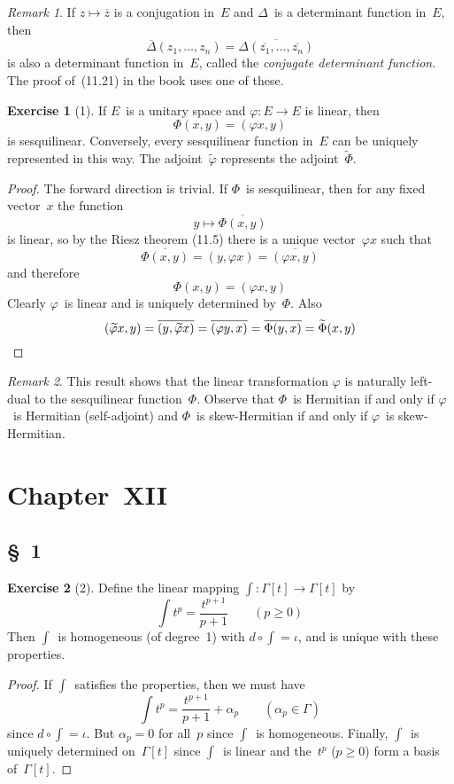 \documentclass[letterpaper,12pt]{article}
\newcommand{\after}{\circ}
\newcommand{\iprod}[2]{(#1,#2)}
\newcommand{\adj}[1]{\widetilde{#1}}
\newcommand{\conj}[1]{\overline{#1}}
\theoremstyle{definition}
\newtheorem*{exer}{Exercise}
\theoremstyle{remark}
\newtheorem*{rmk}{Remark}
\begin{document}
\begin{rmk}
If \(z\mapsto\conj{z}\) is a conjugation in~\(E\) and \(\Delta\)~is a determinant function in~\(E\), then
\[\conj{\Delta}(z_1,\ldots,z_n)=\conj{\Delta(\conj{z_1},\ldots,\conj{z_n})}\]
is also a determinant function in~\(E\), called the \emph{conjugate determinant function}. The proof of~(11.21) in the book uses one of these.
\end{rmk}

\begin{exer}[1]
If \(E\)~is a unitary space and \(\varphi:E\to E\) is linear, then
\[\Phi(x,y)=\iprod{\varphi x}{y}\]
is sesquilinear. Conversely, every sesquilinear function in~\(E\) can be uniquely represented in this way. The adjoint~\(\adj{\varphi}\) represents the adjoint~\(\adj{\Phi}\).
\end{exer}
\begin{proof}
The forward direction is trivial. If \(\Phi\)~is sesquilinear, then for any fixed vector~\(x\) the function
\[y\mapsto\conj{\Phi(x,y)}\]
is linear, so by the Riesz theorem (11.5) there is a unique vector~\(\varphi x\) such that
\[\conj{\Phi(x,y)}=\iprod{y}{\varphi x}=\conj{\iprod{\varphi x}{y}}\]
and therefore
\[\Phi(x,y)=\iprod{\varphi x}{y}\]
Clearly \(\varphi\)~is linear and is uniquely determined by~\(\Phi\). Also
\[\iprod{\adj{\varphi}x}{y}=\conj{\iprod{y}{\adj{\varphi}x}}=\conj{\iprod{\varphi y}{x}}=\conj{\Phi(y,x)}=\adj{\Phi}(x,y)\qedhere\]
\end{proof}
\begin{rmk}
This result shows that the linear transformation \(\varphi\) is naturally left-dual to the sesquilinear function~\(\Phi\). Observe that \(\Phi\)~is Hermitian if and only if \(\varphi\)~is Hermitian (self-adjoint) and \(\Phi\)~is skew-Hermitian if and only if \(\varphi\)~is skew-Hermitian.
\end{rmk}

\section*{Chapter~XII}
\subsection*{\S~1}
\begin{exer}[2]
Define the linear mapping \(\int:\Gamma[t]\to\Gamma[t]\) by
\[\int t^p=\frac{t^{p+1}}{p+1}\qquad(p\ge 0)\]
Then \(\int\)~is homogeneous (of degree~1) with \(d\after\int=\iota\), and is unique with these properties.
\end{exer}
\begin{proof}
If \(\int\)~satisfies the properties, then we must have
\[\int t^p=\frac{t^{p+1}}{p+1}+\alpha_p\qquad(\alpha_p\in\Gamma)\]
since \(d\after\int=\iota\). But \(\alpha_p=0\) for all~\(p\) since \(\int\)~is homogeneous. Finally, \(\int\)~is uniquely determined on~\(\Gamma[t]\) since \(\int\)~is linear and the~\(t^p\) (\(p\ge 0\)) form a basis of~\(\Gamma[t]\).
\end{proof}
\end{document}
